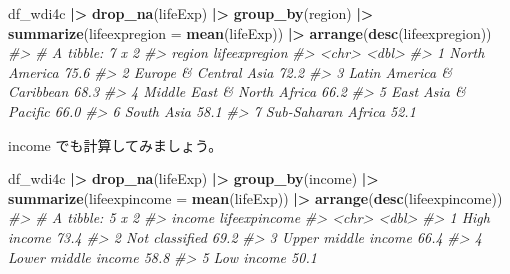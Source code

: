 \documentclass[
  xelatex, ja=standard]{bxjsbook}
\newenvironment{Shaded}{\begin{snugshade}}{\end{snugshade}}
\newcommand{\AttributeTok}[1]{\textcolor[rgb]{0.13,0.29,0.53}{#1}}
\newcommand{\CommentTok}[1]{\textcolor[rgb]{0.56,0.35,0.01}{\textit{#1}}}
\newcommand{\FunctionTok}[1]{\textcolor[rgb]{0.13,0.29,0.53}{\textbf{#1}}}
\newcommand{\NormalTok}[1]{#1}
\newcommand{\SpecialCharTok}[1]{\textcolor[rgb]{0.81,0.36,0.00}{\textbf{#1}}}
\theoremstyle{definition}
\theoremstyle{definition}
\theoremstyle{definition}
\theoremstyle{definition}
\theoremstyle{remark}
\begin{document}
\begin{Shaded}
\begin{Highlighting}[]
\NormalTok{df\_wdi4c }\SpecialCharTok{|\textgreater{}} \FunctionTok{drop\_na}\NormalTok{(lifeExp) }\SpecialCharTok{|\textgreater{}} 
  \FunctionTok{group\_by}\NormalTok{(region) }\SpecialCharTok{|\textgreater{}} \FunctionTok{summarize}\NormalTok{(}\AttributeTok{lifeexpregion =} \FunctionTok{mean}\NormalTok{(lifeExp)) }\SpecialCharTok{|\textgreater{}}
  \FunctionTok{arrange}\NormalTok{(}\FunctionTok{desc}\NormalTok{(lifeexpregion))}
\CommentTok{\#\textgreater{} \# A tibble: 7 x 2}
\CommentTok{\#\textgreater{}   region                     lifeexpregion}
\CommentTok{\#\textgreater{}   \textless{}chr\textgreater{}                              \textless{}dbl\textgreater{}}
\CommentTok{\#\textgreater{} 1 North America                       75.6}
\CommentTok{\#\textgreater{} 2 Europe \& Central Asia               72.2}
\CommentTok{\#\textgreater{} 3 Latin America \& Caribbean           68.3}
\CommentTok{\#\textgreater{} 4 Middle East \& North Africa          66.2}
\CommentTok{\#\textgreater{} 5 East Asia \& Pacific                 66.0}
\CommentTok{\#\textgreater{} 6 South Asia                          58.1}
\CommentTok{\#\textgreater{} 7 Sub{-}Saharan Africa                  52.1}
\end{Highlighting}
\end{Shaded}

income でも計算してみましょう。

\begin{Shaded}
\begin{Highlighting}[]
\NormalTok{df\_wdi4c }\SpecialCharTok{|\textgreater{}} \FunctionTok{drop\_na}\NormalTok{(lifeExp) }\SpecialCharTok{|\textgreater{}} 
  \FunctionTok{group\_by}\NormalTok{(income) }\SpecialCharTok{|\textgreater{}} \FunctionTok{summarize}\NormalTok{(}\AttributeTok{lifeexpincome =} \FunctionTok{mean}\NormalTok{(lifeExp)) }\SpecialCharTok{|\textgreater{}}
  \FunctionTok{arrange}\NormalTok{(}\FunctionTok{desc}\NormalTok{(lifeexpincome))}
\CommentTok{\#\textgreater{} \# A tibble: 5 x 2}
\CommentTok{\#\textgreater{}   income              lifeexpincome}
\CommentTok{\#\textgreater{}   \textless{}chr\textgreater{}                       \textless{}dbl\textgreater{}}
\CommentTok{\#\textgreater{} 1 High income                  73.4}
\CommentTok{\#\textgreater{} 2 Not classified               69.2}
\CommentTok{\#\textgreater{} 3 Upper middle income          66.4}
\CommentTok{\#\textgreater{} 4 Lower middle income          58.8}
\CommentTok{\#\textgreater{} 5 Low income                   50.1}
\end{Highlighting}
\end{Shaded}
\end{document}
